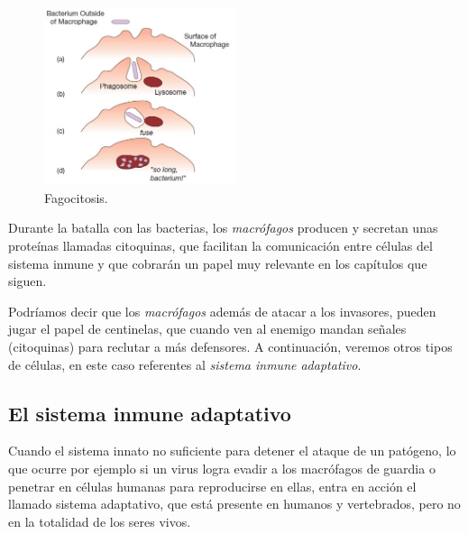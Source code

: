 \begin{figure}[t]
	\centering
	\includegraphics[width=0.5\textwidth]{1_macrofago}
	\caption{Fagocitosis.}
	\label{fig:macrofago}
\end{figure}


Durante la batalla con las bacterias, los \textit{macrófagos} producen y secretan unas proteínas llamadas citoquinas, que facilitan la comunicación entre células del sistema inmune y que cobrarán un papel muy relevante en los capítulos que siguen.

Podríamos decir que los \textit{macrófagos} además de atacar a los invasores, pueden jugar el papel de centinelas, que cuando ven al enemigo mandan señales (citoquinas) para reclutar a más defensores. A continuación, veremos otros tipos de células, en este caso referentes al \textit{sistema inmune adaptativo}.

\subsection{El sistema inmune adaptativo}
\label{sub:sistInmAdap}

Cuando el sistema innato no suficiente para detener el ataque de un patógeno, lo que ocurre por ejemplo si un virus logra evadir  a los macrófagos de guardia o  penetrar en células humanas para reproducirse en ellas, entra en acción el llamado sistema adaptativo, que está presente en humanos y vertebrados, pero no en la totalidad de los seres vivos.

